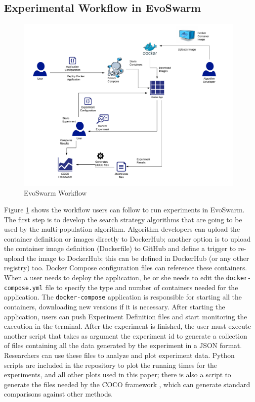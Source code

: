 \documentclass[review]{elsarticle}
\begin{document}
\subsection{Experimental Workflow in EvoSwarm} 
\label{experiment_flow}

\begin{figure}
    \centering
    \includegraphics[width=\textwidth]{experiment_flow}
    \caption{EvoSwarm Workflow}
    \label{fig:experiment_flow}
\end{figure}

Figure \ref{fig:experiment_flow} shows the workflow users can follow to run
experiments in Evo\-Swarm. The first step is to develop the search strategy
algorithms that are going to be used by the multi-population algorithm.
Algorithm developers can upload the container definition or images directly to
DockerHub; another option is to upload the container image definition (Dockerfile) to
GitHub and define a trigger to re-upload the image to DockerHub; this
can be defined in DockerHub (or any other registry) too.  Docker Compose
configuration files can reference these containers. When a user needs to deploy
the application, he or she needs to edit the {\tt docker-compose.yml} file
to specify the type and number of containers needed for the application.  The {\tt docker-compose}
application is responsible for starting all the containers, downloading new
versions if it is necessary. After starting the application, users can push
Experiment Definition files and start monitoring the execution in the terminal.
After the experiment is finished, the user must execute another script
that takes as argument the
experiment id to generate a collection of files containing all the
data generated by the experiment in a JSON format.
Researchers can use these files to analyze and plot experiment data.  Python
scripts are included in the repository to plot the running times for the
experiments, and all other plots used in this paper;  there is also a script to
generate the files needed by the COCO framework \cite{hansen2016coco}, which can generate standard
comparisons against other methods.
\end{document}
